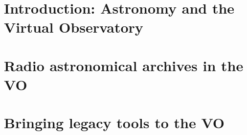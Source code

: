 \documentclass[11pt,a4paper,openright]{memoir}
\begin{document}
	
	
	
	\frontmatter
	
% 
 	\setlength{\parskip}{1\lineskip plus 1\lineskip minus 1\lineskip} 
 	

	
	
	\mainmatter %
	
	\part{Introduction: Astronomy and the Virtual Observatory}
	\label{prt:intro_vo}
	
	
	
	
	
	\part[Radio astronomical archives in the VO]
	{Radio astronomical archives in the VO}
	\label{partRadioDataModelling}
	
	
	
	
	
	
	
	
	
	
	\part{Bringing legacy tools to the VO}
	\label{prt:legacyTools}
	
	
	
	
	
\end{document}
